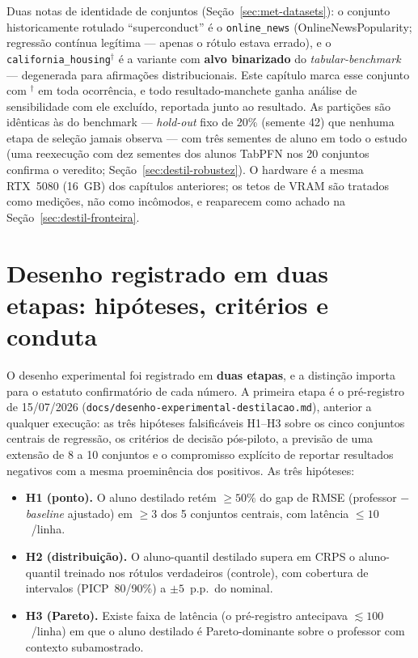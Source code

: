 \begin{sloppypar}
Duas notas de identidade de conjuntos
(Seção~\ref{sec:met-datasets}): o conjunto historicamente rotulado
``superconduct'' é o \texttt{online\_news} (OnlineNewsPopularity;
regressão contínua legítima --- apenas o rótulo estava errado), e o
\texttt{california\_\allowbreak housing}$^\dagger$ é a variante com \textbf{alvo
binarizado} do \emph{tabular-benchmark} --- degenerada para afirmações
distribucionais. Este capítulo marca esse conjunto com $^\dagger$ em
toda ocorrência, e todo resultado-manchete ganha análise de
sensibilidade com ele excluído, reportada junto ao resultado. As
partições são idênticas às do benchmark --- \emph{hold-out} fixo de
20\% (semente 42) que nenhuma etapa de seleção jamais observa --- com
três sementes de aluno em todo o estudo (uma reexecução com dez
sementes dos alunos TabPFN nos 20 conjuntos confirma o veredito;
Seção~\ref{sec:destil-robustez}). O hardware é a mesma
RTX~5080 (16~GB) dos capítulos anteriores; os tetos de VRAM são
tratados como medições, não como incômodos, e reaparecem como achado
na Seção~\ref{sec:destil-fronteira}.
\end{sloppypar}

\section{Desenho registrado em duas etapas: hipóteses, critérios e conduta}
\label{sec:destil-desenho}

O desenho experimental foi registrado em \textbf{duas etapas}, e a
distinção importa para o estatuto confirmatório de cada número. A
primeira etapa é o pré-registro de 15/07/2026
(\texttt{docs/}\allowbreak\texttt{desenho-experimental-destilacao.md}),
anterior a qualquer execução: as três hipóteses falsificáveis H1--H3
sobre os cinco conjuntos centrais de regressão, os critérios de
decisão pós-piloto, a previsão de uma extensão de 8 a 10 conjuntos e
o compromisso explícito de reportar resultados negativos com a mesma
proeminência dos positivos. As três hipóteses:

\begin{itemize}
  \item \textbf{H1 (ponto).} O aluno destilado retém $\geq 50\%$ do
    gap de RMSE (professor $-$ \emph{baseline} ajustado) em $\geq 3$ dos 5
    conjuntos centrais, com latência $\leq 10$~\us/linha.
  \item \textbf{H2 (distribuição).} O aluno-quantil destilado supera
    em CRPS o aluno-quantil treinado nos rótulos verdadeiros
    (controle), com cobertura de intervalos (PICP~80/90\%) a
    $\pm 5$~p.p.\ do nominal.
  \item \textbf{H3 (Pareto).} Existe faixa de latência (o
    pré-registro antecipava ${\lesssim}100$~\us/linha) em que o aluno
    destilado é Pareto-dominante sobre o professor com contexto
    subamostrado.
\end{itemize}

